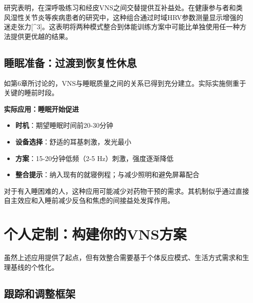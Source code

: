 \documentclass[
  Letterpaper,
]{scrbook}
\providecommand{\tightlist}{%
  \setlength{\itemsep}{0pt}\setlength{\parskip}{0pt}}\usepackage{longtable,booktabs,array}
\begin{document}
研究表明，在深呼吸练习和经皮VNS之间交替提供互补益处。在健康参与者和类风湿性关节炎等疾病患者的研究中，这种组合通过时域HRV参数测量显示增强的迷走张力{[}\^{}3{]}。这表明将两种模式整合到体能训练方案中可能比单独使用任一种方法提供更优越的结果。

\subsection{睡眠准备：过渡到恢复性休息}\label{ux7761ux7720ux51c6ux5907ux8fc7ux6e21ux5230ux6062ux590dux6027ux4f11ux606f}

如第6章所讨论的，VNS与睡眠质量之间的关系已得到充分建立。实际实施侧重于关键的睡前时段。

\textbf{实际应用：睡眠开始促进}

\begin{itemize}
\tightlist
\item
  \textbf{时机}：期望睡眠时间前20-30分钟
\item
  \textbf{设备选择}：舒适的耳基刺激，发光最小
\item
  \textbf{方案}：15-20分钟低频（2-5 Hz）刺激，强度逐渐降低
\item
  \textbf{整合提示}：纳入现有的就寝例程；与减少照明和避免屏幕配合
\end{itemize}

对于有入睡困难的人，这种应用可能减少对药物干预的需求。其机制似乎通过直接自主效应和入睡前减少反刍和焦虑的间接益处发挥作用。

\section{个人定制：构建你的VNS方案}\label{ux4e2aux4ebaux5b9aux5236ux6784ux5efaux4f60ux7684vnsux65b9ux6848}

虽然上述应用提供了起点，但有效整合需要基于个体反应模式、生活方式需求和生理基线的个性化。

\subsection{跟踪和调整框架}\label{ux8ddfux8e2aux548cux8c03ux6574ux6846ux67b6}
\end{document}
